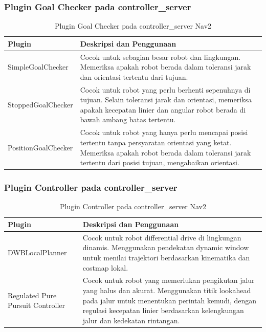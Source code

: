 \documentclass{article}
\begin{document}
\subsubsection*{Plugin Goal Checker pada controller\_server}
\begin{table}[H]
  \centering
  \renewcommand{\arraystretch}{1.2}
  \begin{tabular}{|p{4cm}|p{7cm}|}
    \hline
    \textbf{Plugin}     & \textbf{Deskripsi dan Penggunaan}                                                                                                                                                                           \\
    \hline
    SimpleGoalChecker   & Cocok untuk sebagian besar robot dan lingkungan. Memeriksa apakah robot berada dalam toleransi jarak dan orientasi tertentu dari tujuan.                                                                    \\
    \hline
    StoppedGoalChecker  & Cocok untuk robot yang perlu berhenti sepenuhnya di tujuan. Selain toleransi jarak dan orientasi, memeriksa apakah kecepatan linier dan angular robot berada di bawah ambang batas tertentu.                \\
    \hline
    PositionGoalChecker & Cocok untuk robot yang hanya perlu mencapai posisi tertentu tanpa persyaratan orientasi yang ketat. Memeriksa apakah robot berada dalam toleransi jarak tertentu dari posisi tujuan, mengabaikan orientasi. \\
    \hline
  \end{tabular}
  \caption{Plugin Goal Checker pada controller\_server Nav2}
\end{table}

\subsubsection*{Plugin Controller pada controller\_server}
\begin{table}[H]
  \centering
  \renewcommand{\arraystretch}{1.2}
  \begin{tabular}{|p{4cm}|p{7cm}|}
    \hline
    \textbf{Plugin}                   & \textbf{Deskripsi dan Penggunaan}                                                                                                                                                                                                           \\
    \hline
    DWBLocalPlanner                   & Cocok untuk robot differential drive di lingkungan dinamis. Menggunakan pendekatan dynamic window untuk menilai trajektori berdasarkan kinematika dan costmap lokal.                                                                        \\
    \hline
    Regulated Pure Pursuit Controller & Cocok untuk robot yang memerlukan pengikutan jalur yang halus dan akurat. Menggunakan titik lookahead pada jalur untuk menentukan perintah kemudi, dengan regulasi kecepatan linier berdasarkan kelengkungan jalur dan kedekatan rintangan. \\
    \hline
  \end{tabular}
  \caption{Plugin Controller pada controller\_server Nav2}
\end{table}
\end{document}
